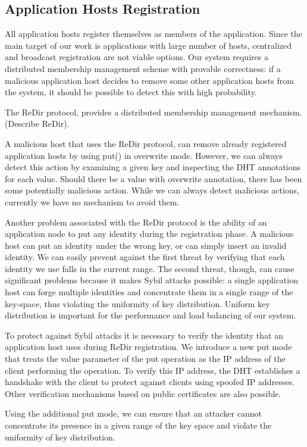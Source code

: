 \documentclass{article}
\begin{document}
\subsection{Application Hosts Registration}
All application hosts register themselves as members of the
application. Since the main target of our work is applications with
large number of hosts, centralized and broadcast registration are not
viable options. Our system requires a distributed membership
management scheme with provable correctness: if a malicious
application host decides to remove some other application hosts from
the system, it should be possible to detect this with high
probability. 

The ReDir protocol, provides a distributed membership management
mechanism. (Describe ReDir). 

A malicious host that uses the ReDir protocol, can remove
already registered application hosts by using put() in overwrite
mode. However, we can always detect this action by examining a given key
and inspecting the DHT annotations for each value. Should there be a
value with overwrite annotation, there has been some potentially
malicious action. While we can always detect malicious actions,
currently we have no mechanism to avoid them.

Another problem associated with the ReDir protocol is the ability of
an application node to put any identity during the registration phase. A
malicious host can put an identity under the wrong key, or can simply
insert an invalid identity. We can easily prevent against the first
threat by verifying that each identity we use falls in the current
range. The second threat, though, can cause significant problems
because it makes Sybil attacks possible: a single application host can
forge multiple identities and concentrate them in a single range of
the key-space, thus violating the uniformity of key
distribution. Uniform key distribution is important for the
performance and load balancing of our system.

To protect against Sybil attacks it is necessary to verify the
identity that an application host uses during ReDir registration. We
introduce a new put mode that treats the value parameter of the
put operation as the IP address of the client performing the
operation. To verify this IP address, the DHT establishes a handshake
with the client to protect against clients using spoofed IP
addresses. Other verification mechanisms based on public certificates
are also possible. 

Using the additional put mode, we can ensure that an attacker cannot
concentrate its presence in a given range of the key space and violate
the uniformity of key distribution. 
\end{document}
